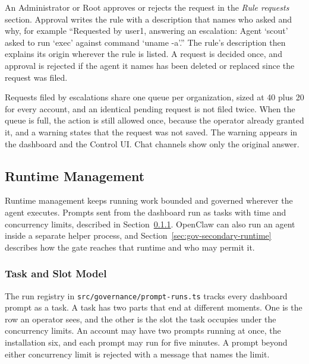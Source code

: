 An Administrator or Root approves or rejects the request in the
\textit{Rule requests} section. Approval writes the rule with a
description that names who asked and why, for example ``Requested by user1,
answering an escalation: Agent `scout' asked to run `exec' against command
`uname -a'.'' The rule's description then explains its origin wherever
the rule is listed. A request is decided once, and approval is rejected if the agent it
names has been deleted or replaced since the request was filed.

Requests filed by escalations share one queue per organization, sized at 40
plus 20 for every account, and an identical pending request is not filed
twice. When the queue is full, the action is still allowed once, because
the operator already granted it, and a warning states that the request was
not saved. The warning appears in the dashboard and the Control UI. Chat
channels show only the original answer.

\FloatBarrier
\subsection{Runtime Management}
\label{sec:gov-runs}

Runtime management keeps running work bounded and governed wherever the
agent executes. Prompts sent from the dashboard run as tasks with time and
concurrency limits, described in Section~\ref{sec:gov-task-slot}. OpenClaw
can also run an agent inside a separate helper process, and
Section~\ref{sec:gov-secondary-runtime} describes how the gate reaches that
runtime and who may permit it.

\subsubsection{Task and Slot Model}
\label{sec:gov-task-slot}

The run registry in \texttt{src/governance/prompt-runs.ts} tracks every
dashboard prompt as a task. A task has two parts that end at
different moments. One is the row an operator sees, and the other is the
slot the task occupies under the concurrency limits. An account may have two prompts running at once,
the installation six, and each prompt may run for five minutes. A prompt
beyond either concurrency limit is rejected with a message that names the
limit.

